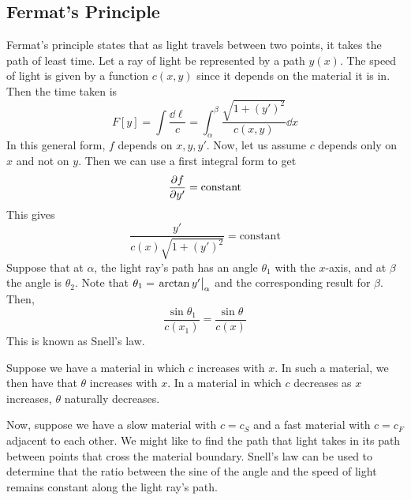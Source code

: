 \subsection{Fermat's Principle}
Fermat's principle states that as light travels between two points, it takes the path of least time. Let a ray of light be represented by a path \( y(x) \). The speed of light is given by a function \( c(x, y) \) since it depends on the material it is in. Then the time taken is
\[ F[y] = \int \frac{\dd{\ell}}{c} = \int_\alpha^\beta \frac{\sqrt{1 + (y')^2}}{c(x, y)} \dd{x} \]
In this general form, \( f \) depends on \( x, y, y' \). Now, let us assume \( c \) depends only on \( x \) and not on \( y \). Then we can use a first integral form to get
\[ \pdv{f}{y'} = \text{constant} \]
This gives
\[ \frac{y'}{c(x)\sqrt{1 + (y')^2}} = \text{constant} \]
Suppose that at \( \alpha \), the light ray's path has an angle \( \theta_1 \) with the \( x \)-axis, and at \( \beta \) the angle is \( \theta_2 \). Note that \( \theta_1 = \eval{\arctan y'}_{\alpha} \) and the corresponding result for \( \beta \). Then,
\[ \frac{\sin\theta_1}{c(x_1)} = \frac{\sin\theta}{c(x)} \]
This is known as Snell's law.

Suppose we have a material in which \( c \) increases with \( x \). In such a material, we then have that \( \theta \) increases with \( x \). In a material in which \( c \) decreases as \( x \) increases, \( \theta \) naturally decreases.

Now, suppose we have a slow material with \( c = c_S \) and a fast material with \( c = c_F \) adjacent to each other. We might like to find the path that light takes in its path between points that cross the material boundary. Snell's law can be used to determine that the ratio between the sine of the angle and the speed of light remains constant along the light ray's path.
